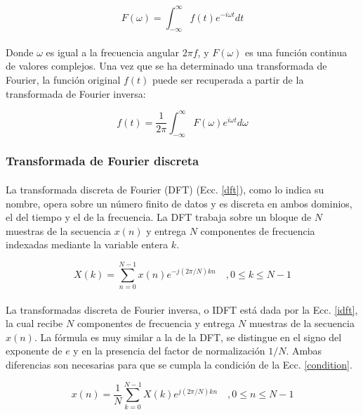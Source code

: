 \documentclass[12pt]{article}%
\begin{document}
\begin{equation}
F(\omega)=\int_{-\infty}^{\infty}f(t)e^{-i{\omega}t}dt
\end{equation}

\paragraph{}
Donde $\omega$ es igual a la frecuencia angular $2{\pi}f$, y $F(\omega)$ es una función continua de valores complejos. Una vez que se ha determinado una transformada de Fourier, la función original $f(t)$ puede ser recuperada a partir de la transformada de Fourier inversa:

\begin{equation}
f(t)=\frac{1}{2\pi}\int_{-\infty}^{\infty}F(\omega)e^{i{\omega}t}d\omega
\end{equation}

\subsubsection{Transformada de Fourier discreta}

\paragraph{}
La transformada discreta de Fourier (DFT) (Ecc. \ref{dft}), como lo indica su nombre, opera sobre un número finito de datos y es discreta en ambos dominios, el del tiempo y el de la frecuencia. La DFT trabaja sobre un bloque de $N$ muestras de la secuencia $x(n)$ y entrega $N$ componentes de frecuencia indexadas mediante la variable entera $k$.

\begin{equation}
\label{dft}
X(k) = \sum_{n=0}^{N-1}x(n)e^{-j(2\pi/N)kn} \quad , 0 \leq k \leq N-1
\end{equation}

\paragraph{}
La transformadas discreta de Fourier inversa, o IDFT está dada por la Ecc. \ref{idft}, la cual recibe $N$ componentes de frecuencia y entrega $N$ muestras de la secuencia $x(n)$. La fórmula es muy similar a la de la DFT, se distingue en el signo del exponente de $e$ y en la presencia del factor de normalización $1/N$. Ambas diferencias son necesarias para que se cumpla la condición de la Ecc. \ref{condition}.

\begin{equation}
\label{idft}
x(n)=\frac{1}{N}\sum_{k=0}^{N-1}X(k)e^{j(2\pi/N)kn} \quad ,0 \leq n \leq N-1
\end{equation}
\end{document}
